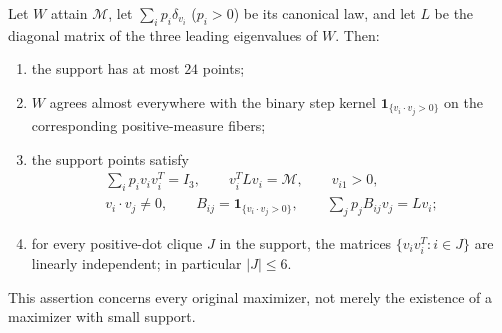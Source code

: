 \begin{theorem}\label{structure-main}
Let $W$ attain $\mathcal M$, let $\sum_i p_i\delta_{v_i}$ ($p_i>0$) be its
canonical law, and let $L$ be the diagonal matrix of the three leading
eigenvalues of $W$. Then:
\begin{enumerate}[leftmargin=2.2em,itemsep=2pt]
\item[(a)] the support has at most $24$ points;
\item[(b)] $W$ agrees almost everywhere with the binary step kernel
$\mathbf1_{\{v_i\cdot v_j>0\}}$ on the corresponding positive-measure
fibers;
\item[(c)] the support points satisfy
\begin{gather*}
 \sum_i p_iv_iv_i^T=I_3,\qquad v_i^TLv_i=\mathcal M,\qquad v_{i1}>0,\\
 v_i\cdot v_j\ne0,\qquad
 B_{ij}=\mathbf1_{\{v_i\cdot v_j>0\}},\qquad
 \sum_jp_jB_{ij}v_j=Lv_i;
\end{gather*}
\item[(d)] for every positive-dot clique $J$ in the support, the matrices
$\{v_iv_i^T:i\in J\}$ are linearly independent; in particular $|J|\le6$.
\end{enumerate}
\end{theorem}
This assertion concerns every original maximizer, not merely the
existence of a maximizer with small support.
